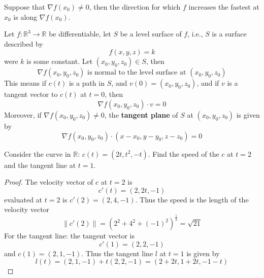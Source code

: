 \documentclass[openany]{book}
\newcommand{\R}{\mathbb{R}}
\begin{document}
\begin{prop}
    Suppose that $\nabla f(x_0)\neq 0$, then the direction for which $f$ increases the fastest at $x_0$ is along $\nabla f(x_0)$.
\end{prop}


\begin{prop}
    Let $f:\R^3\to\R$ be differentiable, let $S$ be a level surface of $f$, i.e., $S$ is a surface described by 
    \begin{equation*}
        f(x,y,z)=k
    \end{equation*}
    were $k$ is some constant. Let $(x_0,y_0,z_0)\in S$, then
    \begin{equation*}
        \nabla f(x_0,y_0,z_0) \text{ is normal to the level surface at } (x_0,y_0,z_0)
    \end{equation*}
    This means if $c(t)$ is a path in $S$, and $v(0)=(x_0,y_0,z_0)$, and if $v$ is a tangent vector to $c(t)$ at $t=0$, then 
    \begin{equation*}
        \nabla f(x_0,y_0, z_0)\cdot v=0
    \end{equation*}
    Moreover, if $\nabla f(x_0,y_0,z_0)\neq 0$, the \textbf{tangent plane} of $S$ at $(x_0,y_0,z_0)$ is given by 
    \begin{equation*}
        \nabla f(x_0,y_0,z_0)\cdot (x-x_0, y-y_0, z-z_0)=0
    \end{equation*}
\end{prop}










\begin{prob}
    Consider the curve in $\R$: $c(t)=(2t, t^2,-t)$. Find the speed of the $c$ at $t=2$ and the tangent line at $t=1$.
\end{prob}
\begin{proof}
    The velocity vector of $c$ at $t=2$ is 
    \begin{equation*}
        c'(t)=(2, 2t, -1)
    \end{equation*}
    evaluated at $t=2$ is $c'(2)=(2, 4, -1)$. Thus the speed is the length of the velocity vector 
    \begin{equation*}
        \|c'(2)\|=\left(2^2+4^2+(-1)^2\right)^\frac{1}{2}=\sqrt{21}
    \end{equation*}
    For the tangent line: the tangent vector is 
    \begin{equation*}
        c'(1)=(2,2, -1)
    \end{equation*}
    and $c(1)=(2, 1, -1)$. Thus the tangent line $l$ at $t=1$ is given by 
    \begin{equation*}
        l(t)=(2,1,-1)+t(2,2,-1)=(2+2t, 1+2t, -1-t)
    \end{equation*}
\end{proof}
\end{document}

